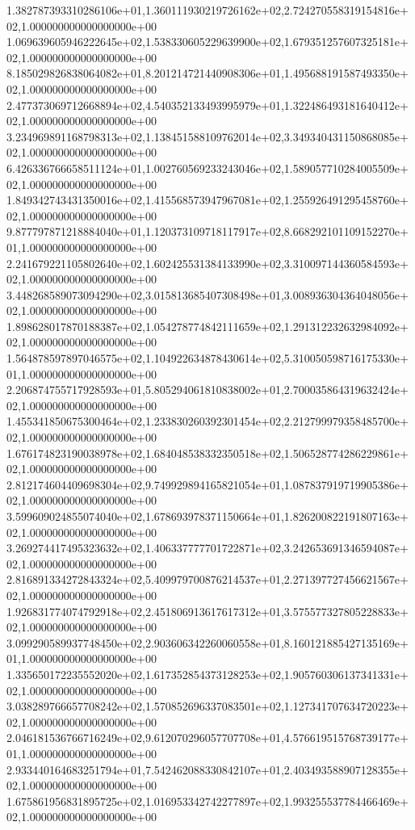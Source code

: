 1.382787393310286106e+01,1.360111930219726162e+02,2.724270558319154816e+02,1.000000000000000000e+00
1.069639605946222645e+02,1.538330605229639900e+02,1.679351257607325181e+02,1.000000000000000000e+00
8.185029826838064082e+01,8.201214721440908306e+01,1.495688191587493350e+02,1.000000000000000000e+00
2.477373069712668894e+02,4.540352133493995979e+01,1.322486493181640412e+02,1.000000000000000000e+00
3.234969891168798313e+02,1.138451588109762014e+02,3.349340431150868085e+02,1.000000000000000000e+00
6.426336766658511124e+01,1.002760569233243046e+02,1.589057710284005509e+02,1.000000000000000000e+00
1.849342743431350016e+02,1.415568573947967081e+02,1.255926491295458760e+02,1.000000000000000000e+00
9.877797871218884040e+01,1.120373109718117917e+02,8.668292101109152270e+01,1.000000000000000000e+00
2.241679221105802640e+02,1.602425531384133990e+02,3.310097144360584593e+02,1.000000000000000000e+00
3.448268589073094290e+02,3.015813685407308498e+01,3.008936304364048056e+02,1.000000000000000000e+00
1.898628017870188387e+02,1.054278774842111659e+02,1.291312232632984092e+02,1.000000000000000000e+00
1.564878597897046575e+02,1.104922634878430614e+02,5.310050598716175330e+01,1.000000000000000000e+00
2.206874755717928593e+01,5.805294061810838002e+01,2.700035864319632424e+02,1.000000000000000000e+00
1.455341850675300464e+02,1.233830260392301454e+02,2.212799979358485700e+02,1.000000000000000000e+00
1.676174823190038978e+02,1.684048538332350518e+02,1.506528774286229861e+02,1.000000000000000000e+00
2.812174604409698304e+02,9.749929894165821054e+01,1.087837919719905386e+02,1.000000000000000000e+00
3.599609024855074040e+02,1.678693978371150664e+01,1.826200822191807163e+02,1.000000000000000000e+00
3.269274417495323632e+02,1.406337777701722871e+02,3.242653691346594087e+02,1.000000000000000000e+00
2.816891334272843324e+02,5.409979700876214537e+01,2.271397727456621567e+02,1.000000000000000000e+00
1.926831774074792918e+02,2.451806913617617312e+01,3.575577327805228833e+02,1.000000000000000000e+00
3.099290589937748450e+02,2.903606342260060558e+01,8.160121885427135169e+01,1.000000000000000000e+00
1.335650172235552020e+02,1.617352854373128253e+02,1.905760306137341331e+02,1.000000000000000000e+00
3.038289766657708242e+02,1.570852696337083501e+02,1.127341707634720223e+02,1.000000000000000000e+00
2.046181536766716249e+02,9.612070296057707708e+01,4.576619515768739177e+01,1.000000000000000000e+00
2.933440164683251794e+01,7.542462088330842107e+01,2.403493588907128355e+02,1.000000000000000000e+00
1.675861956831895725e+02,1.016953342742277897e+02,1.993255537784466469e+02,1.000000000000000000e+00
